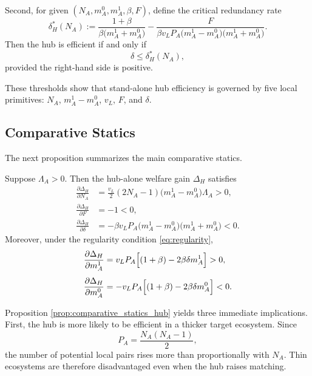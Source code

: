 Second, for given $(N_A,m_A^0,m_A^1,\beta,F)$, define the critical redundancy rate
\begin{equation}
\delta_H^*(N_A)
:=
\frac{1+\beta}{\beta\bigl(m_A^1+m_A^0\bigr)}
-
\frac{F}{\beta v_L P_A\bigl(m_A^1-m_A^0\bigr)\bigl(m_A^1+m_A^0\bigr)}.
\label{eq:deltastar}
\end{equation}
Then the hub is efficient if and only if
\[
\delta \le \delta_H^*(N_A),
\]
provided the right-hand side is positive.

These thresholds show that stand-alone hub efficiency is governed by five local primitives: $N_A$, $m_A^1-m_A^0$, $v_L$, $F$, and $\delta$.

\subsection{Comparative Statics}

The next proposition summarizes the main comparative statics.

\begin{proposition}
\label{prop:comparative_statics_hub}
Suppose $\Lambda_A>0$. Then the hub-alone welfare gain $\Delta_H$ satisfies
\begin{align}
\frac{\partial \Delta_H}{\partial N_A}
&=
\frac{v_L}{2}(2N_A-1)\bigl(m_A^1-m_A^0\bigr)\Lambda_A
>0,
\label{eq:dDelta_dN}
\\[0.4em]
\frac{\partial \Delta_H}{\partial F}
&=
-1
<0,
\label{eq:dDelta_dF}
\\[0.4em]
\frac{\partial \Delta_H}{\partial \delta}
&=
-\beta v_L P_A \bigl(m_A^1-m_A^0\bigr)\bigl(m_A^1+m_A^0\bigr)
<0.
\label{eq:dDelta_ddelta}
\end{align}
Moreover, under the regularity condition \eqref{eq:regularity},
\begin{align}
\frac{\partial \Delta_H}{\partial m_A^1}
&=
v_L P_A\Bigl[(1+\beta)-2\beta\delta m_A^1\Bigr]
>0,
\label{eq:dDelta_dm1}
\\[0.4em]
\frac{\partial \Delta_H}{\partial m_A^0}
&=
- v_L P_A\Bigl[(1+\beta)-2\beta\delta m_A^0\Bigr]
<0.
\label{eq:dDelta_dm0}
\end{align}
\end{proposition}

Proposition \ref{prop:comparative_statics_hub} yields three immediate implications. First, the hub is more likely to be efficient in a thicker target ecosystem. Since
\[
P_A=\frac{N_A(N_A-1)}{2},
\]
the number of potential local pairs rises more than proportionally with $N_A$. Thin ecosystems are therefore disadvantaged even when the hub raises matching.

